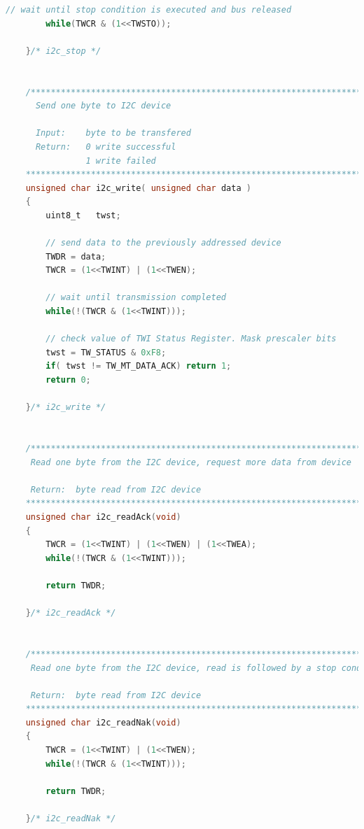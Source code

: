 \documentclass{article}
\numberwithin{figure}{section}
\numberwithin{equation}{section}
\begin{document}
{\begin{lstlisting}[language=C,label=lst:twimaster.c,caption=twimaster.c]
    	// wait until stop condition is executed and bus released
    	while(TWCR & (1<<TWSTO));

    }/* i2c_stop */


    /*************************************************************************
      Send one byte to I2C device

      Input:    byte to be transfered
      Return:   0 write successful
                1 write failed
    *************************************************************************/
    unsigned char i2c_write( unsigned char data )
    {
        uint8_t   twst;

    	// send data to the previously addressed device
    	TWDR = data;
    	TWCR = (1<<TWINT) | (1<<TWEN);

    	// wait until transmission completed
    	while(!(TWCR & (1<<TWINT)));

    	// check value of TWI Status Register. Mask prescaler bits
    	twst = TW_STATUS & 0xF8;
    	if( twst != TW_MT_DATA_ACK) return 1;
    	return 0;

    }/* i2c_write */


    /*************************************************************************
     Read one byte from the I2C device, request more data from device

     Return:  byte read from I2C device
    *************************************************************************/
    unsigned char i2c_readAck(void)
    {
    	TWCR = (1<<TWINT) | (1<<TWEN) | (1<<TWEA);
    	while(!(TWCR & (1<<TWINT)));

        return TWDR;

    }/* i2c_readAck */


    /*************************************************************************
     Read one byte from the I2C device, read is followed by a stop condition

     Return:  byte read from I2C device
    *************************************************************************/
    unsigned char i2c_readNak(void)
    {
    	TWCR = (1<<TWINT) | (1<<TWEN);
    	while(!(TWCR & (1<<TWINT)));

        return TWDR;

    }/* i2c_readNak */
\end{lstlisting}

}
\end{document}
